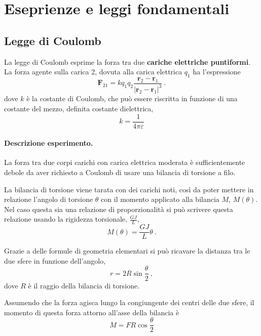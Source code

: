 \section{Eseprienze e leggi fondamentali}
\subsection{Legge di Coulomb}
La legge di Coulomb esprime la forza tra due \textbf{cariche elettriche puntiformi}. La forza agente sulla carica 2, dovuta alla carica elettrica $q_1$ ha l'espressione
\begin{equation}
    \mathbf{F}_{21} = k q_1 q_2 \dfrac{\mathbf{r}_2 - \mathbf{r}_1}{|\mathbf{r}_2 - \mathbf{r}_1|^3} \ . 
\end{equation}
dove $k$ è la costante di Coulomb, che può essere riscritta in funzione di una costante del mezzo, definita costante dielettrica,
\begin{equation}
    k = \dfrac{1}{4 \pi \varepsilon}
\end{equation}

\paragraph{Descrizione esperimento.} La forza tra due corpi carichi con carica elettrica moderata è sufficientemente debole da aver richiesto a Coulomb di usare una bilancia di torsione a filo.

\noindent
La bilancia di torsione viene tarata con dei carichi noti, così da poter mettere in relazione l'angolo di torsione $\theta$ con il momento applicato alla bilancia $M$, $M(\theta)$. Nel caso questa sia una relazione di proporzionalità si può scrivere questa relazione usando la rigidezza torsionale, $\frac{GJ}{L}$,
\begin{equation}
    M(\theta) = \dfrac{GJ}{L} \theta \ .
\end{equation}

\noindent
Grazie a delle formule di geometria elementari si può ricavare la distanza tra le due sfere in funzione dell'angolo,
\begin{equation}
    r = 2 R \sin \frac{\theta}{2} \ ,
\end{equation}
dove $R$ è il raggio della bilancia di torsione.

\noindent
Assumendo che la forza agisca lungo la congiungente dei centri delle due sfere, il momento di questa forza attorno all'asse della bilancia è
\begin{equation}
    M = F R \cos \frac{\theta}{2}
\end{equation}

